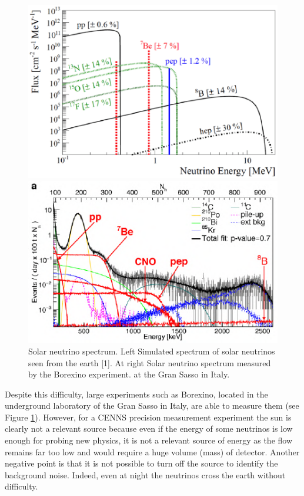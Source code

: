 \begin{figure}
\begin{minipage}{0.48\textwidth}
\includegraphics [scale=1]{Figures/Introduction/solar_neutrino_spectrum_simu.pdf}
\end{minipage}
\hfill
\begin{minipage}{0.48\textwidth}
\includegraphics [scale=1]{Figures/Introduction/solar_neutrino_spectrum_exp.pdf}
\end{minipage}
\caption{Solar neutrino spectrum. Left Simulated spectrum of solar neutrinos seen from
the earth [1]. At right Solar neutrino spectrum measured by the Borexino experiment.
at the Gran Sasso in Italy.}
\label{fig:solar-neutrino-spectrum}
\end{figure}

Despite this difficulty, large experiments such as Borexino, located in the underground laboratory of the Gran Sasso in Italy, are able to measure them (see Figure \ref{fig:solar-neutrino-spectrum}). However, for a CENNS precision measurement experiment the sun is clearly not a relevant source because even if the energy of some neutrinos is low enough for probing new physics, it is not a relevant source of energy as the flow remains far too low and would require a huge volume (mass) of detector. Another negative point is that it is not possible to turn off the source to identify the background noise. Indeed, even at night the neutrinos cross the earth without difficulty.

